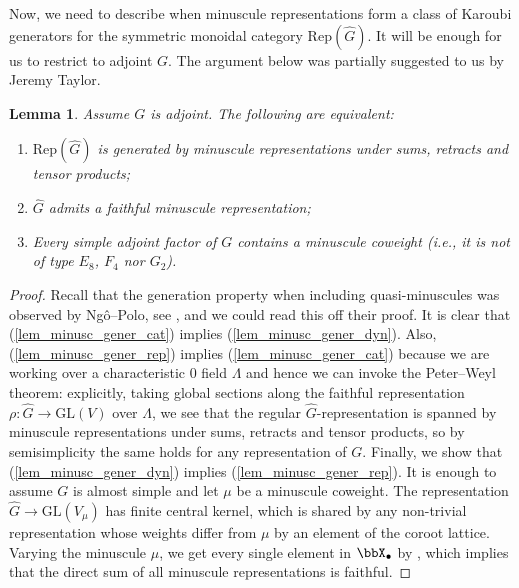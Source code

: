 \documentclass[10pt, reqno]{amsart}
\theoremstyle{plain}
\newtheorem{lemma}[theorem]{Lemma}
\theoremstyle{definition}
\numberwithin{equation}{section}
\begin{document}
Now, we need to describe when minuscule representations form a class of Karoubi generators for the symmetric monoidal category $\mathrm{Rep}(\hat{G})$. It will be enough for us to restrict to adjoint $G$. The argument below was partially suggested to us by Jeremy Taylor.

\begin{lemma}\label{lem_minusc_gener}
	Assume $G$ is adjoint. The following are equivalent:
	\begin{enumerate}
		\item \label{lem_minusc_gener_cat} $\mathrm{Rep}(\hat{G})$ is generated by minuscule representations under sums, retracts and tensor products;
		\item \label{lem_minusc_gener_rep}$\hat{G}$ admits a faithful minuscule representation;
		\item \label{lem_minusc_gener_dyn} Every simple adjoint factor of $G$ contains a minuscule coweight (i.e., it is not of type $E_8$, $F_4$ nor $G_2$).
	\end{enumerate}
\end{lemma}

\begin{proof}
	Recall that the generation property when including quasi-minuscules was observed by Ngô--Polo, see \cite[Lemma 10.3]{NP01}, and we could read this off their proof. It is clear that (\ref{lem_minusc_gener_cat}) implies (\ref{lem_minusc_gener_dyn}). Also, (\ref{lem_minusc_gener_rep}) implies (\ref{lem_minusc_gener_cat}) because we are working over a characteristic $0$ field $\Lambda$ and hence we can invoke the Peter--Weyl theorem: explicitly, taking global sections along the faithful representation $\rho \colon \hat{G}\to \mathrm{GL}(V)$ over $\Lambda$, we see that the regular $\hat{G}$-representation is spanned by minuscule representations under sums, retracts and tensor products, so by semisimplicity the same holds for any representation of $G$.
	Finally, we show that (\ref{lem_minusc_gener_dyn}) implies (\ref{lem_minusc_gener_rep}). It is enough to assume $G$ is almost simple and let $\mu$ be a minuscule coweight. The representation $\hat{G} \to \mathrm{GL}(V_\mu)$ has finite central kernel, which is shared by any non-trivial representation whose weights differ from $\mu$ by an element of the coroot lattice. Varying the minuscule $\mu$, we get every single element in $\bbX_\bullet$ by \cite[Exercices 24--25, p.~225]{Bou68}, which implies that the direct sum of all minuscule representations is faithful.
\end{proof}
\end{document}
